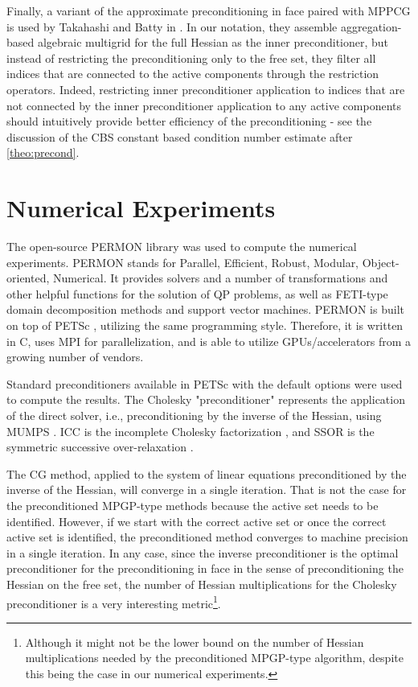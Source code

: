 \documentclass[11pt]{article}
\theoremstyle{plain}
\theoremstyle{definition}
\begin{document}
Finally, a variant of the approximate preconditioning in face paired with MPPCG is used by Takahashi and Batty in \cite{Takahashi2023}.
In our notation, they assemble aggregation-based algebraic multigrid for the full Hessian as the inner preconditioner, but instead of restricting the preconditioning only to the free set, they filter all indices that are connected to the active components through the restriction operators.
Indeed, restricting inner preconditioner application to indices that are not connected by the inner preconditioner application to any active components should intuitively provide better efficiency of the preconditioning - see the discussion of the CBS constant based condition number estimate after \cref{theo:precond}.

\FloatBarrier
\section{Numerical Experiments}
\label{sec:results}
The open-source PERMON library \cite{permon,permongit} was used to compute the numerical experiments.
PERMON stands for Parallel, Efficient, Robust, Modular, Object-oriented, Numerical.
It provides solvers and a number of transformations and other helpful functions for the solution of QP problems, as well as FETI-type domain decomposition methods and support vector machines.
PERMON is built on top of PETSc \cite{petsc-web-page,petsc-user-ref,petsc-efficient}, utilizing the same programming style. Therefore, it is written in C, uses MPI for parallelization, and is able to utilize GPUs/accelerators from a growing number of vendors.

Standard preconditioners available in PETSc with the default options were used to compute the results.
The Cholesky "preconditioner" represents the application of the direct solver, i.e., preconditioning by the inverse of the Hessian, using MUMPS \cite{Amestoy2001,Amestoy2019}.
ICC is the incomplete Cholesky factorization \cite{Chan1997}, and SSOR is the symmetric successive over-relaxation \cite{Young1971}.

The CG method, applied to the system of linear equations preconditioned by the inverse of the Hessian, will converge in a single iteration.
That is not the case for the preconditioned MPGP-type methods because the active set needs to be identified.
However, if we start with the correct active set or once the correct active set is identified, the preconditioned method converges to machine precision in a single iteration.
In any case, since the inverse preconditioner is the optimal preconditioner for the preconditioning in face in the sense of preconditioning the Hessian on the free set, the number of Hessian multiplications for the Cholesky preconditioner is a very interesting metric\footnote{
Although it might not be the lower bound on the number of Hessian multiplications needed by the preconditioned MPGP-type algorithm, despite this being the case in our numerical experiments.}.
\end{document}
